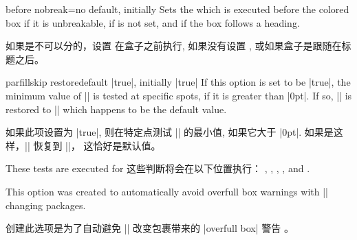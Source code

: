 \begin{docTcbKey}[][doc new=2014-12-16]{before nobreak}{=}{no default, initially }
Sets the  which is executed before the colored box if it
is unbreakable, if  is not set, and if
the box follows a heading.

如果是不可以分的，设置  在盒子之前执行, 如果没有设置  , 或如果盒子是跟随在标题之后。
\end{docTcbKey}



\begin{docTcbKey}[][doc new=2017-02-23]{parfillskip restore}{}{default |true|, initially |true|}
If this option is set to be |true|, the minimum value of |\parfillskip| is
tested at specific spots, if it is greater than |0pt|.
If so, |\parfillskip| is restored to |\@flushglue| which happens to be
the default value.

如果此项设置为 |true|, 则在特定点测试 |\parfillskip| 的最小值, 如果它大于 |0pt|.
如果是这样，|\parfillskip| 恢复到 |\@flushglue|， 这恰好是默认值。

These tests are executed for
这些判断将会在以下位置执行：
,
,
,
, and
.

This option was created to automatically
avoid overfull box warnings with |\parfillskip| changing packages.

创建此选项是为了自动避免 |\parfillskip| 改变包裹带来的 |overfull box| 警告 。
\end{docTcbKey}